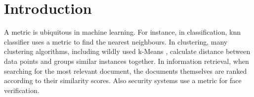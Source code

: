 \documentclass[12pt,a4paper]{report}
\begin{document}



\tableofcontents







%
%
%
%
%
%

\chapter{Introduction} \label{chap:intro}

A metric is ubiquitous in machine learning. For instance, in classification, \ac{knn} classifier \citep{cover1967nearest} uses a metric to find the nearest neighbours. In clustering, many clustering algorithms, including wildly used k-Means \citep{hartigan1979algorithm}, calculate distance between data points and groups similar instances together. In information retrieval, when searching for the most relevant document, the documents themselves are ranked according to their similarity scores. Also security systems use a metric for face verification.
\end{document}
